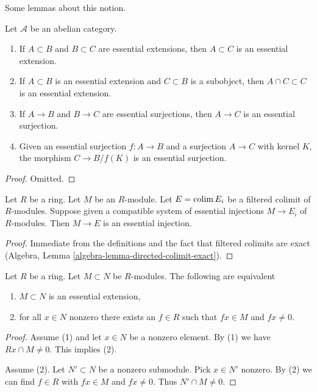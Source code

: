 \noindent
Some lemmas about this notion.

\begin{lemma}
\label{lemma-essential}
Let $\mathcal{A}$ be an abelian category.
\begin{enumerate}
\item If $A \subset B$ and $B \subset C$ are essential extensions, then
$A \subset C$ is an essential extension.
\item If $A \subset B$ is an essential extension and $C \subset B$
is a subobject, then $A \cap C \subset C$ is an essential extension.
\item If $A \to B$ and $B \to C$ are essential surjections, then
$A \to C$ is an essential surjection.
\item Given an essential surjection $f : A \to B$ and a surjection
$A \to C$ with kernel $K$, the morphism $C \to B/f(K)$ is an essential
surjection.
\end{enumerate}
\end{lemma}

\begin{proof}
Omitted.
\end{proof}

\begin{lemma}
\label{lemma-union-essential-extensions}
Let $R$ be a ring. Let $M$ be an $R$-module. Let $E = \mathop{\mathrm{colim}}\nolimits E_i$
be a filtered colimit of $R$-modules. Suppose given a compatible
system of essential injections $M \to E_i$ of $R$-modules.
Then $M \to E$ is an essential injection.
\end{lemma}

\begin{proof}
Immediate from the definitions and the fact that filtered
colimits are exact (Algebra, Lemma \ref{algebra-lemma-directed-colimit-exact}).
\end{proof}

\begin{lemma}
\label{lemma-essential-extension}
Let $R$ be a ring. Let $M \subset N$ be $R$-modules. The following
are equivalent
\begin{enumerate}
\item $M \subset N$ is an essential extension,
\item for all $x \in N$ nonzero there exists an $f \in R$ such that $fx \in M$
and $fx \not = 0$.
\end{enumerate}
\end{lemma}

\begin{proof}
Assume (1) and let $x \in N$ be a nonzero element. By (1) we have
$Rx \cap M \not = 0$. This implies (2).

\medskip\noindent
Assume (2). Let $N' \subset N$ be a nonzero submodule. Pick $x \in N'$
nonzero. By (2) we can find $f \in R$ with $fx \in M$ and $fx \not = 0$.
Thus $N' \cap M \not = 0$.
\end{proof}




